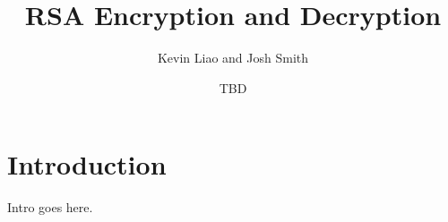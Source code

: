 \documentclass[a4paper]{article}
\title{RSA Encryption and Decryption}
\author{Kevin Liao and Josh Smith}
\date{TBD}
\begin{document}
\maketitle

\section{Introduction}
Intro goes here.
\end{document}
